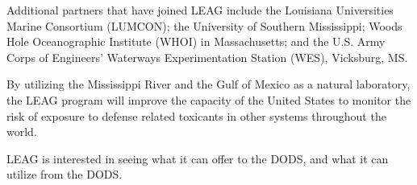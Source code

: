 Additional partners that have joined LEAG include the Louisiana Universities Marine 
Consortium (LUMCON); the University of Southern Mississippi; Woods Hole Oceanographic 
Institute (WHOI) in Massachusetts; and the U.S. Army Corps of Engineers' Waterways 
Experimentation Station (WES), Vicksburg, MS.

By utilizing the Mississippi River and the Gulf of Mexico as a natural laboratory, the LEAG 
program will improve the capacity of the United States to monitor the risk of exposure to 
defense related toxicants in other systems throughout the world.

LEAG is interested in seeing what it can offer to the DODS, and what it can utilize from the 
DODS.

